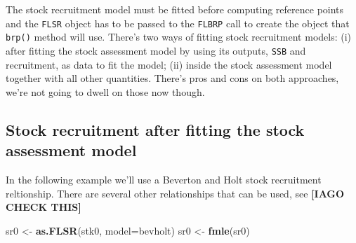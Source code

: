 \documentclass[
]{book}
\newenvironment{Shaded}{\begin{snugshade}}{\end{snugshade}}
\newcommand{\AttributeTok}[1]{\textcolor[rgb]{0.13,0.29,0.53}{#1}}
\newcommand{\FunctionTok}[1]{\textcolor[rgb]{0.13,0.29,0.53}{\textbf{#1}}}
\newcommand{\NormalTok}[1]{#1}
\newcommand{\OtherTok}[1]{\textcolor[rgb]{0.56,0.35,0.01}{#1}}
\begin{document}
The stock recruitment model must be fitted before computing reference points and the \texttt{FLSR} object has to be passed to the \texttt{FLBRP} call to create the object that \texttt{brp()} method will use. There's two ways of fitting stock recruitment models: (i) after fitting the stock assessment model by using its outputs, \texttt{SSB} and recruitment, as data to fit the model; (ii) inside the stock assessment model together with all other quantities. There's pros and cons on both approaches, we're not going to dwell on those now though.

\hypertarget{stock-recruitment-after-fitting-the-stock-assessment-model}{%
\subsection{Stock recruitment after fitting the stock assessment model}\label{stock-recruitment-after-fitting-the-stock-assessment-model}}

In the following example we'll use a Beverton and Holt stock recruitment reltionship. There are several other relationships that can be used, see \textbf{{[}IAGO CHECK THIS{]}}

\begin{Shaded}
\begin{Highlighting}[]
\NormalTok{sr0 }\OtherTok{\textless{}{-}} \FunctionTok{as.FLSR}\NormalTok{(stk0, }\AttributeTok{model=}\NormalTok{bevholt)}
\NormalTok{sr0 }\OtherTok{\textless{}{-}} \FunctionTok{fmle}\NormalTok{(sr0)}
\end{Highlighting}
\end{Shaded}
\end{document}
